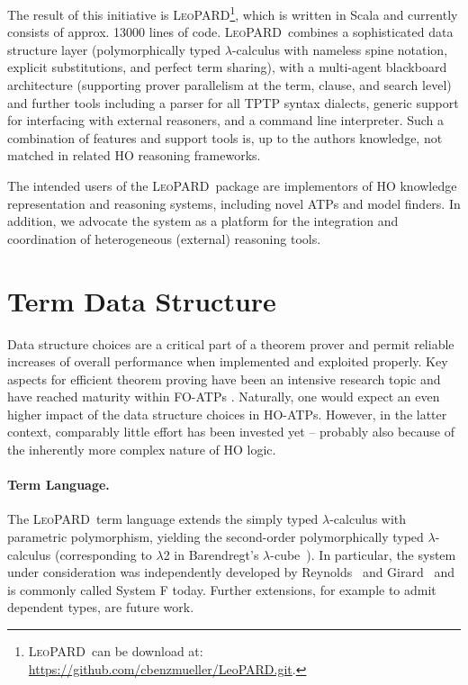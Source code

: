 \documentclass{llncs}
\def\sys{\mbox{\textsc{LeoPARD}}}
\begin{document}
 \sloppy The result of this initiative is \sys \footnote{\sys\ can be download at:  
   \url{https://github.com/cbenzmueller/LeoPARD.git}.}, which is written in
 Scala and currently consists of approx. 13000 lines of
 code. 
 \sys\ combines a
 sophisticated data structure layer \cite{SteenMSc} (polymorphically typed $\lambda$-calculus with nameless spine
 notation, explicit substitutions, and perfect term sharing), with a
 multi-agent blackboard architecture \cite{WisniewskiMSc} (supporting prover parallelism at the term, clause, and search
 level) and  further tools including a parser for all TPTP 
 \cite{DBLP:journals/jar/Sutcliffe09,J22} syntax dialects, generic
 support for interfacing with external reasoners, and a command line
 interpreter.  Such a combination of features and support tools is, up to the
 authors knowledge, not matched in related HO reasoning frameworks.

 The intended users of the \sys\ package are implementors of HO
 knowledge representation and reasoning systems, including novel ATPs and
 model finders. In addition, we
 advocate the system as a platform for the integration and
 coordination of heterogeneous (external) reasoning tools.
 

\section{Term Data Structure}
Data structure choices are a critical part of a theorem prover and
permit reliable increases of overall performance when implemented and exploited
properly. Key aspects for efficient theorem proving have been an
intensive research topic and have reached maturity within FO-ATPs
\cite{riazanov2003implementing,Sekar:2001:TI:778522.778535}.
Naturally, one would expect an even higher impact
of the data structure choices in HO-ATPs. However, in the latter
context, comparably little effort has been invested yet --
probably also because of the inherently more complex nature of HO logic.

\paragraph{Term Language.} The \sys\ term language extends the simply typed $\lambda$-calculus
with parametric polymorphism, yielding the second-order
polymorphically typed $\lambda$-calculus (corresponding to $\lambda$2
in Barendregt's $\lambda$-cube~\cite{Barendregt91}). In particular, the system under
consideration was independently developed by
Reynolds~\cite{Reynolds74} and Girard~\cite{girard1972interpretation}
and is commonly called System F today.  Further extensions, for
example to admit dependent types, are future work.
\end{document}

